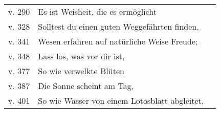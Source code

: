 {\begin{longtable}[c]{llr}
v. 290 & Es ist Weisheit, die es ermöglicht & \pageref{dhp-290}\\
v. 328 & Solltest du einen guten Weggefährten finden, & \pageref{dhp-328}\\
v. 341 & Wesen erfahren auf natürliche Weise Freude; & \pageref{dhp-341}\\
v. 348 & Lass los, was vor dir ist, & \pageref{dhp-348}\\
v. 377 & So wie verwelkte Blüten & \pageref{dhp-377}\\
v. 387 & Die Sonne scheint am Tag, & \pageref{dhp-387}\\
v. 401 & So wie Wasser von einem Lotosblatt abgleitet, & \pageref{dhp-401}\\
\end{longtable}

}

